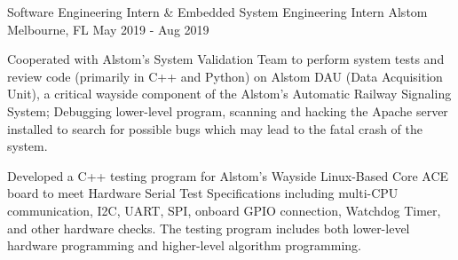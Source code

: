 \begin{cventries}
  \cventry
    {Software Engineering Intern \& Embedded System Engineering Intern} %
    {Alstom} %
    {Melbourne, FL} %
    {May 2019 - Aug 2019} %
    {
      \begin{cvitems} %
        \item {Cooperated with Alstom's System Validation Team to perform system tests and review code (primarily in C++ and Python) on Alstom DAU (Data Acquisition Unit), a critical wayside component of the Alstom's Automatic Railway Signaling System; Debugging lower-level program, scanning and hacking the Apache server installed to search for possible bugs which may lead to the fatal crash of the system.}
        \item {Developed a C++ testing program for Alstom's Wayside Linux-Based Core ACE board to meet Hardware Serial Test Specifications including multi-CPU communication, I2C, UART, SPI, onboard GPIO connection, Watchdog Timer, and other hardware checks. The testing program includes both lower-level hardware programming and higher-level algorithm programming.}
      \end{cvitems}
    }

\end{cventries}
